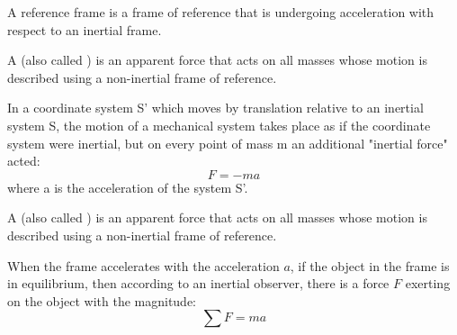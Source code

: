            \par A  reference frame is a frame of reference that is undergoing
            acceleration with respect to an inertial frame.

            \par A  (also called ) is an apparent
            force that acts on all masses whose motion is described using a non-inertial frame
            of reference.

            \par In a coordinate system S' which moves by translation relative to an inertial
            system S, the motion of a mechanical system takes place as if the coordinate system
            were inertial, but on every point of mass m an additional "inertial force" acted:
            \begin{equation}
                F = -ma
            \end{equation}
            where a is the acceleration of the system S'.

            \par A  (also called ) is an apparent
            force that acts on all masses whose motion is described using a non-inertial frame
            of reference.
            \par When the frame accelerates with the acceleration $a$, if the object in the frame
            is in equilibrium, then according to an inertial observer, there is a force $F$
            exerting on the object with the magnitude:
            \begin{equation}
                \sum F = ma
            \end{equation}


